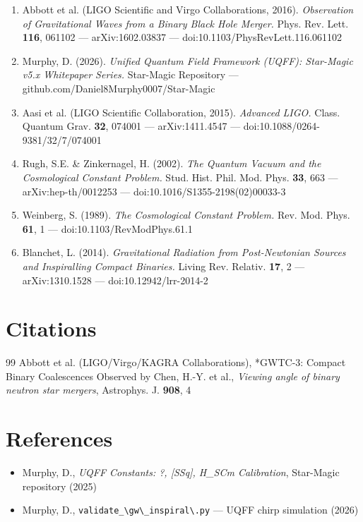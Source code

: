 \documentclass[12pt,a4paper]{article}
\begin{document}
\begin{enumerate}
  \item Abbott et al. (LIGO Scientific and Virgo Collaborations, 2016). \emph{Observation of Gravitational Waves from a Binary Black Hole Merger.} Phys. Rev. Lett. \textbf{116}, 061102 --- arXiv:1602.03837 --- doi:10.1103/PhysRevLett.116.061102
  \item Murphy, D. (2026). \emph{Unified Quantum Field Framework (UQFF): Star-Magic v5.x Whitepaper Series.} Star-Magic Repository --- github.com/Daniel8Murphy0007/Star-Magic
  \item Aasi et al. (LIGO Scientific Collaboration, 2015). \emph{Advanced LIGO.} Class. Quantum Grav. \textbf{32}, 074001 --- arXiv:1411.4547 --- doi:10.1088/0264-9381/32/7/074001
  \item Rugh, S.E. \& Zinkernagel, H. (2002). \emph{The Quantum Vacuum and the Cosmological Constant Problem.} Stud. Hist. Phil. Mod. Phys. \textbf{33}, 663 --- arXiv:hep-th/0012253 --- doi:10.1016/S1355-2198(02)00033-3
  \item Weinberg, S. (1989). \emph{The Cosmological Constant Problem.} Rev. Mod. Phys. \textbf{61}, 1 --- doi:10.1103/RevModPhys.61.1
  \item Blanchet, L. (2014). \emph{Gravitational Radiation from Post-Newtonian Sources and Inspiralling Compact Binaries.} Living Rev. Relativ. \textbf{17}, 2 --- arXiv:1310.1528 --- doi:10.12942/lrr-2014-2
\end{enumerate}


\section*{Citations}
\begin{thebibliography}{99}
 Abbott et al. (LIGO/Virgo/KAGRA Collaborations), *GWTC-3: Compact Binary Coalescences Observed by
 Chen, H.-Y. et al., \emph{Viewing angle of binary neutron star mergers}, Astrophys. J. \textbf{908}, 4
\end{thebibliography}

\section*{References}
\begin{itemize}
  \item[3.] Murphy, D., \emph{UQFF Constants: ?, [SSq], H\_SCm Calibration}, Star-Magic repository (2025)
  \item[4.] Murphy, D., \texttt{validate\_\textbackslash {gw\textbackslash \_inspiral\textbackslash }.py} --- UQFF chirp simulation (2026)
\end{itemize}

\end{document}
